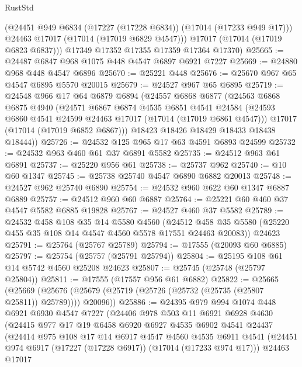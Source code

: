 \begin{lexlean}{RustStd}
\begin{coremodule}
          (@24451 @949 @6834 (@17227 (@17228 @6834)) (@17014 (@17233 @949 @17)))
          @24463
          @17017
          (@17014 (@17019 @6829 @4547)))
        @17017
        (@17014 (@17019 @6823 @6837)))
      @17349
      @17352
      @17355
      @17359
      @17364
      @17370)
@25665 := @24487 @6847 @968 @1075 @448 @4547 @6897 @6921 @7227
@25669 := @24880 @968 @448 @4547 @6896
@25670 := @25221 @448
@25676 := @25670 @967 @65 @4547 @6895 @5570 @20015
@25679 := @24527 @967 @65 @6895
@25719 := @24548
    @966
    @17
    @64
    @6879
    @6894
    (@24557
      @6868
      @6877
      (@24563
        @6868
        @6875
        @4940
        (@24571
          @6867
          @6874
          @4535
          @6851
          @4541
          @24584
          (@24593 @6860 @4541 @24599 @24463 @17017 (@17014 (@17019 @6861 @4547)))
          @17017
          (@17014 (@17019 @6852 @6867)))
        @18423
        @18426
        @18429
        @18433
        @18438
        @18444))
@25726 := @24532 @125 @965 @17 @63 @4591 @6893 @24599
@25732 := @24532 @963 @460 @61 @37 @6891 @5582
@25735 := @24512 @963 @61 @6891
@25737 := @25220 @956 @61
@25738 := @25737 @962
@25740 := @10 @60 @1347
@25745 := @25738 @25740 @4547 @6890 @6882 @20013
@25748 := @24527 @962 @25740 @6890
@25754 := @24532 @960 @622 @60 @1347 @6887 @6889
@25757 := @24512 @960 @60 @6887
@25764 := @25221 @60 @460 @37 @4547 @5582 @6885 @19828
@25767 := @24527 @460 @37 @5582
@25789 := @24532
    @458
    @108
    @35
    @14
    @5580
    @4560
    (@24512 @458 @35 @5580 (@25220 @455 @35 @108 @14 @4547 @4560 @5578 @17551 @24463 @20083))
    @24623
@25791 := @25764 (@25767 @25789)
@25794 := @17555 (@20093 @60 @6885)
@25797 := @25754 (@25757 (@25791 @25794))
@25804 := @25195 @108 @61 @14 @5742 @4560 @25208 @24623
@25807 := @25745 (@25748 (@25797 @25804))
@25811 := @17555 (@17557 @956 @61 @6882)
@25822 := @25665
    (@25669 (@25676 (@25679 (@25719 (@25726 (@25732 (@25735 (@25807 @25811)) @25789)))) @20096))
@25886 := @24395
    @979
    @994
    @1074
    @448
    @6921
    @6930
    @4547
    @7227
    (@24406
      @978
      @503
      @11
      @6921
      @6928
      @4630
      (@24415
        @977
        @17
        @19
        @6458
        @6920
        @6927
        @4535
        @6902
        @4541
        @24437
        (@24414
          @975
          @108
          @17
          @14
          @6917
          @4547
          @4560
          @4535
          @6911
          @4541
          (@24451 @974 @6917 (@17227 (@17228 @6917)) (@17014 (@17233 @974 @17)))
          @24463
          @17017

\end{coremodule}
\end{lexlean}
